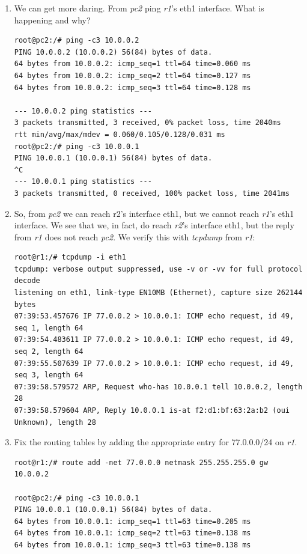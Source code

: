\documentclass[12pt]{book}
\begin{document}
\begin{enumerate}[resume*]
\item We can get more daring. From \emph{pc2} ping \emph{r1}'s eth1 interface. What is happening and why?
  \begin{lstlisting}
root@pc2:/# ping -c3 10.0.0.2
PING 10.0.0.2 (10.0.0.2) 56(84) bytes of data.
64 bytes from 10.0.0.2: icmp_seq=1 ttl=64 time=0.060 ms
64 bytes from 10.0.0.2: icmp_seq=2 ttl=64 time=0.127 ms
64 bytes from 10.0.0.2: icmp_seq=3 ttl=64 time=0.128 ms

--- 10.0.0.2 ping statistics ---
3 packets transmitted, 3 received, 0% packet loss, time 2040ms
rtt min/avg/max/mdev = 0.060/0.105/0.128/0.031 ms
root@pc2:/# ping -c3 10.0.0.1
PING 10.0.0.1 (10.0.0.1) 56(84) bytes of data.
^C
--- 10.0.0.1 ping statistics ---
3 packets transmitted, 0 received, 100% packet loss, time 2041ms
  \end{lstlisting}

\item So, from \emph{pc2} we can reach r2's interface eth1, but we cannot reach \emph{r1}'s eth1 interface. We see that we, in fact, do reach \emph{r2}'s interface eth1, but the reply from \emph{r1} does not reach \emph{pc2}. We verify this with \emph{tcpdump} from \emph{r1}:

  \begin{lstlisting}
root@r1:/# tcpdump -i eth1
tcpdump: verbose output suppressed, use -v or -vv for full protocol decode
listening on eth1, link-type EN10MB (Ethernet), capture size 262144 bytes
07:39:53.457676 IP 77.0.0.2 > 10.0.0.1: ICMP echo request, id 49, seq 1, length 64
07:39:54.483611 IP 77.0.0.2 > 10.0.0.1: ICMP echo request, id 49, seq 2, length 64
07:39:55.507639 IP 77.0.0.2 > 10.0.0.1: ICMP echo request, id 49, seq 3, length 64
07:39:58.579572 ARP, Request who-has 10.0.0.1 tell 10.0.0.2, length 28
07:39:58.579604 ARP, Reply 10.0.0.1 is-at f2:d1:bf:63:2a:b2 (oui Unknown), length 28
  \end{lstlisting}

\item Fix the routing tables by adding the appropriate entry for 77.0.0.0/24 on \emph{r1}. 
  \begin{lstlisting}
root@r1:/# route add -net 77.0.0.0 netmask 255.255.255.0 gw 10.0.0.2

root@pc2:/# ping -c3 10.0.0.1
PING 10.0.0.1 (10.0.0.1) 56(84) bytes of data.
64 bytes from 10.0.0.1: icmp_seq=1 ttl=63 time=0.205 ms
64 bytes from 10.0.0.1: icmp_seq=2 ttl=63 time=0.138 ms
64 bytes from 10.0.0.1: icmp_seq=3 ttl=63 time=0.138 ms


\end{lstlisting}
\end{enumerate}
\end{document}
